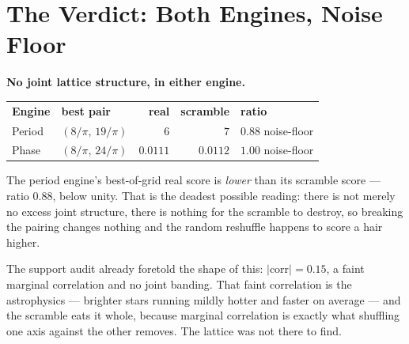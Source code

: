 \documentclass[11pt, letterpaper, openany]{book}
\begin{document}
\section{The Verdict: Both Engines, Noise Floor}

\begin{nullbox}
\textbf{No joint lattice structure, in either engine.}

\medskip
\begin{tabular}{@{}llrr l@{}}
\textbf{Engine} & \textbf{best pair} & \textbf{real} & \textbf{scramble} & \textbf{ratio} \\[2pt]
Period & $(8/\pi,\,19/\pi)$ & $6$ & $7$ & $\mathbf{0.88}$ \; noise-floor \\
Phase  & $(8/\pi,\,24/\pi)$ & $0.0111$ & $0.0112$ & $\mathbf{1.00}$ \; noise-floor  \\
\end{tabular}

\medskip
The period engine's best-of-grid real score is \emph{lower} than its scramble score --- ratio
$0.88$, below unity. That is the deadest possible reading: there is not merely no excess joint
structure, there is nothing for the scramble to destroy, so breaking the pairing changes nothing
and the random reshuffle happens to score a hair higher.
\end{nullbox}

The support audit already foretold the shape of this: $|\mathrm{corr}| = 0.15$, a faint marginal
correlation and no joint banding. That faint correlation is the astrophysics --- brighter stars
running mildly hotter and faster on average --- and the scramble eats it whole, because marginal
correlation is exactly what shuffling one axis against the other removes. The lattice was not
there to find.
\end{document}

